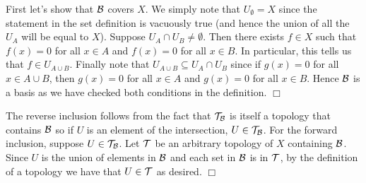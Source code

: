 \documentclass{article}
\begin{document}
 {
    First let's show that $\mathcal{B}$ covers $X$. We simply note that $U_{\emptyset} = X$ since the statement in the set definition is vacuously true (and hence the union of all the $U_{A}$ will be equal to $X$). Suppose $U_{A}\cap U_{B}\neq \emptyset$. Then there exists $f\in X$ such that $f(x) = 0$ for all $x\in A$ and $f(x) = 0$ for all $x\in B$. In particular, this tells us that $f\in U_{A\cup B}$. Finally note that $U_{A\cup B}\subseteq U_{A}\cap U_{B}$ since if $g(x) = 0$ for all $x\in A\cup B$, then $g(x) = 0$ for all $x\in A$ and $g(x) = 0$ for all $x\in B$. Hence $\mathcal{B}$ is a basis as we have checked both conditions in the definition. $\Box$
}

 {
    The reverse inclusion follows from the fact that $\mathcal{T}_{\mathcal{B}}$ is itself a topology that contains $\mathcal{B}$ so if $U$ is an element of the intersection, $U\in \mathcal{T}_{\mathcal{B}}$. For the forward inclusion, suppose $U\in \mathcal{T}_{\mathcal{B}}$. Let $\mathcal{T}$ be an arbitrary topology of $X$ containing $\mathcal{B}$. Since $U$ is the union of elements in $\mathcal{B}$ and each set in $\mathcal{B}$ is in $\mathcal{T}$, by the definition of a topology we have that $U\in \mathcal{T}$ as desired. $\Box$
}
\end{document}

